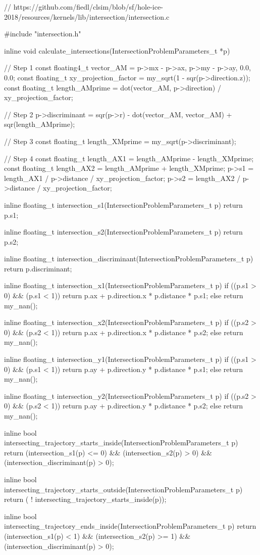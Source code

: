 \begin{ccode}
// https://github.com/fiedl/clsim/blob/sf/hole-ice-2018/resources/kernels/lib/intersection/intersection.c

#include "intersection.h"

inline void calculate_intersections(IntersectionProblemParameters_t *p)
{
  // Step 1
  const floating4_t vector_AM = {p->mx - p->ax, p->my - p->ay, 0.0, 0.0};
  const floating_t xy_projection_factor = my_sqrt(1 - sqr(p->direction.z));
  const floating_t length_AMprime = dot(vector_AM, p->direction) / xy_projection_factor;

  // Step 2
  p->discriminant = sqr(p->r) - dot(vector_AM, vector_AM) + sqr(length_AMprime);

  // Step 3
  const floating_t length_XMprime = my_sqrt(p->discriminant);

  // Step 4
  const floating_t length_AX1 = length_AMprime - length_XMprime;
  const floating_t length_AX2 = length_AMprime + length_XMprime;
  p->s1 = length_AX1 / p->distance / xy_projection_factor;
  p->s2 = length_AX2 / p->distance / xy_projection_factor;
}

inline floating_t intersection_s1(IntersectionProblemParameters_t p)
{
  return p.s1;
}

inline floating_t intersection_s2(IntersectionProblemParameters_t p)
{
  return p.s2;
}

inline floating_t intersection_discriminant(IntersectionProblemParameters_t p)
{
  return p.discriminant;
}

inline floating_t intersection_x1(IntersectionProblemParameters_t p)
{
  if ((p.s1 > 0) && (p.s1 < 1))
    return p.ax + p.direction.x * p.distance * p.s1;
  else
    return my_nan();
}

inline floating_t intersection_x2(IntersectionProblemParameters_t p)
{
  if ((p.s2 > 0) && (p.s2 < 1))
    return p.ax + p.direction.x * p.distance * p.s2;
  else
    return my_nan();
}

inline floating_t intersection_y1(IntersectionProblemParameters_t p)
{
  if ((p.s1 > 0) && (p.s1 < 1))
    return p.ay + p.direction.y * p.distance * p.s1;
  else
    return my_nan();
}

inline floating_t intersection_y2(IntersectionProblemParameters_t p)
{
  if ((p.s2 > 0) && (p.s2 < 1))
    return p.ay + p.direction.y * p.distance * p.s2;
  else
    return my_nan();
}

inline bool intersecting_trajectory_starts_inside(IntersectionProblemParameters_t p)
{
  return (intersection_s1(p) <= 0) &&
      (intersection_s2(p) > 0) &&
      (intersection_discriminant(p) > 0);
}

inline bool intersecting_trajectory_starts_outside(IntersectionProblemParameters_t p)
{
  return ( ! intersecting_trajectory_starts_inside(p));
}

inline bool intersecting_trajectory_ends_inside(IntersectionProblemParameters_t p)
{
  return (intersection_s1(p) < 1) &&
      (intersection_s2(p) >= 1) &&
      (intersection_discriminant(p) > 0);
}
\end{ccode}

